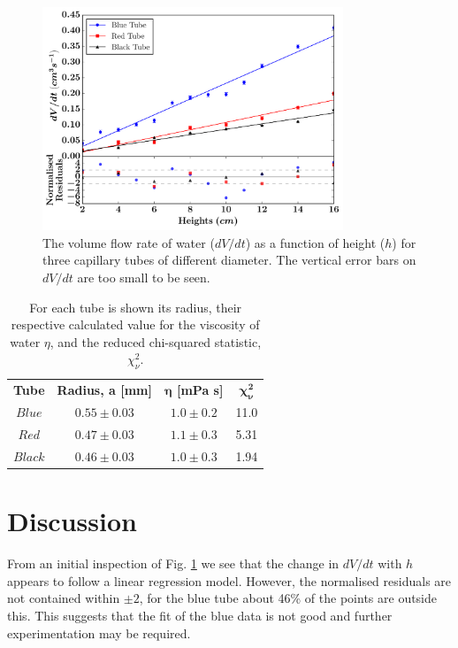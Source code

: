 \documentclass[twocolumn]{revtex4}
\begin{document}
\vspace{-1ex}
\begin{figure}[!h]
\begin{center}
\includegraphics[width=9cm]{fig1-3}
\caption[]{The volume flow rate of water ($dV/dt$) as a function of height ($h$) for three capillary tubes of different diameter. The vertical error bars on $dV/dt$ are too small to be seen.}
\label{fig:fig2}
\end{center}
\end{figure}

\begin{table}[h!]
\centering
\begin{tabular}{c@{\hskip 20pt}c@{\hskip 20pt}c@{\hskip 20pt}c} 
 \hline
 \textbf{Tube} & \textbf{Radius, a [mm]} & \textbf{$\boldsymbol{\eta}$ [mPa {s}]} & \textbf{$\boldsymbol{\chi^2_{\nu}}$} \\ [0.5ex] 
 $Blue$ &$0.55\pm0.03$ & $1.0\pm0.2$ & 11.0 \\ 
 $Red$ & $0.47\pm0.03$ & $1.1\pm0.3$ & 5.31 \\
 $Black$ & $0.46\pm0.03$ & $1.0\pm0.3$ & 1.94 \\
 
 \hline
\end{tabular}
\caption{For each tube is shown its radius, their respective calculated value for the viscosity of water $\eta$, and the reduced chi-squared statistic, $\chi^2_{\nu}$.}
\label{table:1}
\end{table}

\vspace{-3ex}
\section{Discussion}
\vspace{-2ex}
From an initial inspection of Fig. \ref{fig:fig2} we see that the change in $dV/dt$ with $h$ appears to follow a linear regression model. However, the normalised residuals are not contained within $\pm 2$, for the blue tube about 46\% of the points are outside this. This suggests that the fit of the blue data is not good and further experimentation may be required. 
\end{document}
